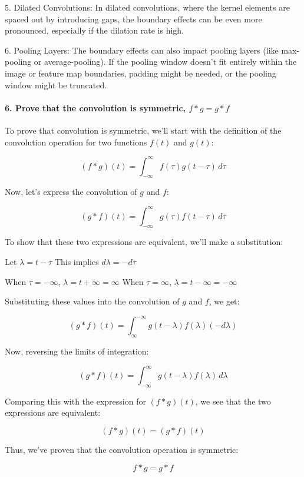 5. Dilated Convolutions: In dilated convolutions, where the kernel elements are spaced out by introducing gaps, the boundary effects can be even more pronounced, especially if the dilation rate is high.

6. Pooling Layers: The boundary effects can also impact pooling layers (like max-pooling or average-pooling).
If the pooling window doesn't fit entirely within the image or feature map boundaries, padding might be needed, or the pooling window might be truncated.

\paragraph{6. Prove that the convolution is symmetric, \(f * g = g * f\)}

To prove that convolution is symmetric, we'll start with the definition of the convolution operation for two functions \( f(t) \) and \( g(t) \):

\[ \left(f * g\right)\left(t\right) = \int_{-\infty}^{\infty} f\left(\tau\right) g\left(t - \tau\right) \, d\tau \]

Now, let's express the convolution of \( g \) and \( f \):

\[ \left(g * f\right)\left(t\right) = \int_{-\infty}^{\infty} g\left(\tau\right) f\left(t - \tau\right) \, d\tau \]

To show that these two expressions are equivalent, we'll make a substitution:

Let \( \lambda = t - \tau \)
This implies \( d\lambda = -d\tau \)

When \( \tau = -\infty \), \( \lambda = t + \infty = \infty \)
When \( \tau = \infty \), \( \lambda = t - \infty = -\infty \)

Substituting these values into the convolution of \( g \) and \( f \), we get:

\[ (g * f)(t) = \int_{\infty}^{-\infty} g(t - \lambda) f(\lambda) (-d\lambda) \]

Now, reversing the limits of integration:

\[ (g * f)(t) = \int_{-\infty}^{\infty} g(t - \lambda) f(\lambda) \, d\lambda \]

Comparing this with the expression for \( (f * g)(t) \), we see that the two expressions are equivalent:

\[ (f * g)(t) = (g * f)(t) \]

Thus, we've proven that the convolution operation is symmetric:

\[ f * g = g * f \]


